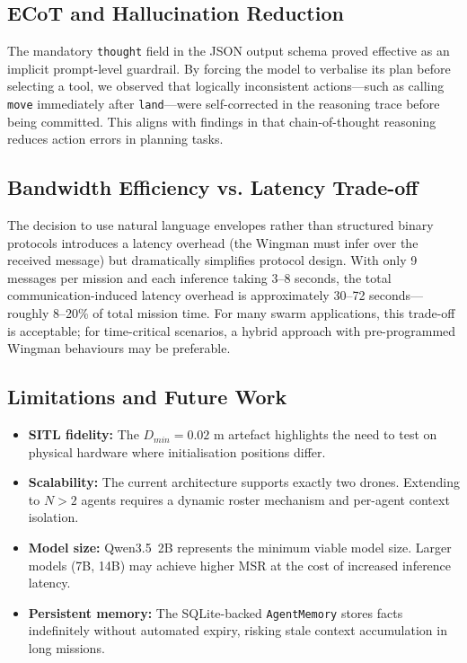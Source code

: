 \documentclass[conference]{IEEEtran}
\begin{document}
\subsection{ECoT and Hallucination Reduction}

The mandatory \texttt{thought} field in the JSON output schema proved effective as an implicit prompt-level guardrail. By forcing the model to verbalise its plan before selecting a tool, we observed that logically inconsistent actions—such as calling \texttt{move} immediately after \texttt{land}—were self-corrected in the reasoning trace before being committed. This aligns with findings in \cite{ref_chain_of_thought} that chain-of-thought reasoning reduces action errors in planning tasks.

\subsection{Bandwidth Efficiency vs. Latency Trade-off}

The decision to use natural language envelopes rather than structured binary protocols introduces a latency overhead (the Wingman must infer over the received message) but dramatically simplifies protocol design. With only 9 messages per mission and each inference taking 3–8 seconds, the total communication-induced latency overhead is approximately 30–72 seconds—roughly 8–20\% of total mission time. For many swarm applications, this trade-off is acceptable; for time-critical scenarios, a hybrid approach with pre-programmed Wingman behaviours may be preferable.

\subsection{Limitations and Future Work}

\begin{itemize}
    \item \textbf{SITL fidelity:} The $D_{min} = 0.02$ m artefact highlights the need to test on physical hardware where initialisation positions differ.
    \item \textbf{Scalability:} The current architecture supports exactly two drones. Extending to $N>2$ agents requires a dynamic roster mechanism and per-agent context isolation.
    \item \textbf{Model size:} Qwen3.5~2B represents the minimum viable model size. Larger models (7B, 14B) may achieve higher MSR at the cost of increased inference latency.
    \item \textbf{Persistent memory:} The SQLite-backed \texttt{AgentMemory} stores facts indefinitely without automated expiry, risking stale context accumulation in long missions.
\end{itemize}
\end{document}
